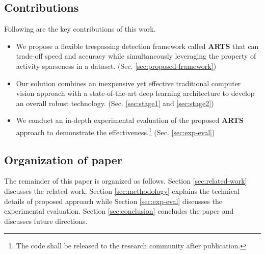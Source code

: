 \subsection{Contributions}
Following are the key contributions of this work. 
\begin{itemize}
\item We propose a flexible trespassing detection framework called \textbf{ARTS} that can trade-off speed and accuracy while simultaneously leveraging the property of activity sparseness in a dataset. (Sec. \ref{sec:proposed-framework})

\item Our solution combines an inexpensive yet effective traditional computer vision approach with a state-of-the-art deep learning architecture to develop an overall robust technology. (Sec. \ref{sec:stage1} and \ref{sec:stage2})

\item We conduct an in-depth experimental evaluation of the proposed \textbf{ARTS} approach to demonstrate the effectiveness.\footnote{The code shall be released to the research community after publication.} (Sec. \ref{sec:exp-eval})
\end{itemize}
\subsection{Organization of paper}
The remainder of this paper is organized as follows.  Section \ref{sec:related-work} discusses the related work. Section \ref{sec:methodology} explains the technical details of proposed approach while Section \ref{sec:exp-eval} discusses the experimental evaluation. Section \ref{sec:conclusion} concludes the paper and discusses future directions. 